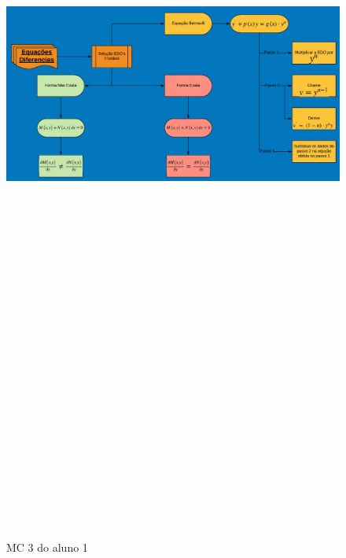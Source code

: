 \begin{landscape}
\begin{figure}[H]
\centering
\caption{MC 3 do aluno 1}
\includegraphics[width=220mm, height=290mm,keepaspectratio]{figuras/MC/mc1_3.png}
\label{mc3a1}
\end{figure}
\end{landscape}


